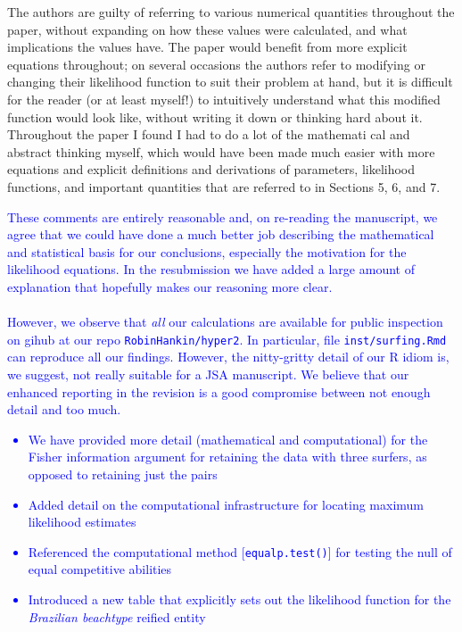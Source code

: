 \documentclass[12pt]{article}
\begin{document}
The authors are guilty
of referring to various numerical quantities throughout the paper,
without expanding on how these values were calculated, and what
implications the values have. The paper would benefit from more
explicit equations throughout; on several occasions the authors refer
to modifying or changing their likelihood function to suit their
problem at hand, but it is difficult for the reader (or at least
myself!) to intuitively understand what this modified function would
look like, without writing it down or thinking hard about
it. Throughout the paper I found I had to do a lot of the mathemati
cal and abstract thinking myself, which would have been made much
easier with more equations and explicit definitions and derivations of
parameters, likelihood functions, and important quantities that are
referred to in Sections 5, 6, and 7.


\textcolor{blue}{These comments are entirely reasonable and, on
  re-reading the manuscript, we agree that we could have done a much
  better job describing the mathematical and statistical basis for our
  conclusions, especially the motivation for the likelihood equations.
  In the resubmission we have added a large amount of explanation that
  hopefully makes our reasoning more clear.\\ \\
  However, we observe that {\em all} our calculations are available
  for public inspection on gihub at our repo {\tt RobinHankin/hyper2}.
  In particular, file {\tt inst/surfing.Rmd} can reproduce all our
  findings.  However, the nitty-gritty detail of our R idiom is, we
  suggest, not really suitable for a JSA manuscript.  We believe that
  our enhanced reporting in the revision is a good compromise between
  not enough detail and too much.
  \begin{itemize}
  \item We have provided more detail (mathematical and computational)
    for the Fisher information argument for retaining the data with
    three surfers, as opposed to retaining just the pairs
  \item Added detail on the computational infrastructure for locating
    maximum likelihood estimates
  \item Referenced the computational method [{\tt equalp.test()}] for
    testing the null of equal competitive abilities
  \item Introduced a new table that explicitly sets out the likelihood
    function for the {\em Brazilian beachtype} reified entity
  \end{itemize}
}
\end{document}
